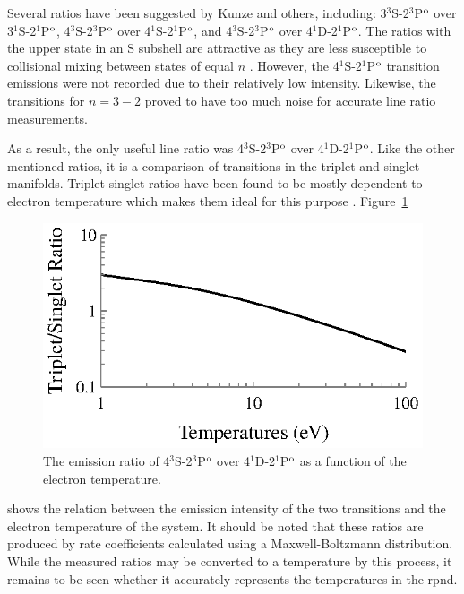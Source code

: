 Several ratios have been suggested by Kunze and others, including:
3$^3$S-2$^3$P$^\mathrm{o}$ over 3$^1$S-2$^1$P$^\mathrm{o}$, 4$^3$S-2$^3$P$^\mathrm{o}$ over
4$^1$S-2$^1$P$^\mathrm{o}$, and 4$^3$S-2$^3$P$^\mathrm{o}$ over 4$^1$D-2$^1$P$^\mathrm{o}$. The
ratios with the upper state in an S subshell are attractive as they are less
susceptible to collisional mixing between states of equal $n$ \cite{Kunze2009}.
However, the 4$^1$S-2$^1$P$^\mathrm{o}$ transition emissions were not recorded due to
their relatively low intensity. Likewise, the transitions for $n=3-2$ proved to
have too much noise for accurate line ratio measurements.

As a result, the only useful line ratio was 4$^3$S-2$^3$P$^\mathrm{o}$ over
4$^1$D-2$^1$P$^\mathrm{o}$. Like the other mentioned ratios, it is a comparison of
transitions in the triplet and singlet manifolds. Triplet-singlet ratios have
been found to be mostly dependent to electron temperature which makes them ideal
for this purpose \cite{Griem2005}. Figure~\ref{fig:conversion}
\begin{figure}
  \centering
  \includegraphics{./chapters/emissions/figures/conversion.eps}
  \caption{The emission ratio of 4$^3$S-2$^3$P$^\mathrm{o}$ over 4$^1$D-2$^1$P$^\mathrm{o}$ as
  a function of the electron temperature.}
  \label{fig:conversion}
\end{figure}
shows the relation between the emission intensity of the two transitions and the
electron temperature of the system. It should be noted that these ratios are
produced by rate coefficients calculated using a Maxwell-Boltzmann distribution.
While the measured ratios may be converted to a temperature by this process, it
remains to be seen whether it accurately represents the temperatures in the
\acs{rpnd}.

